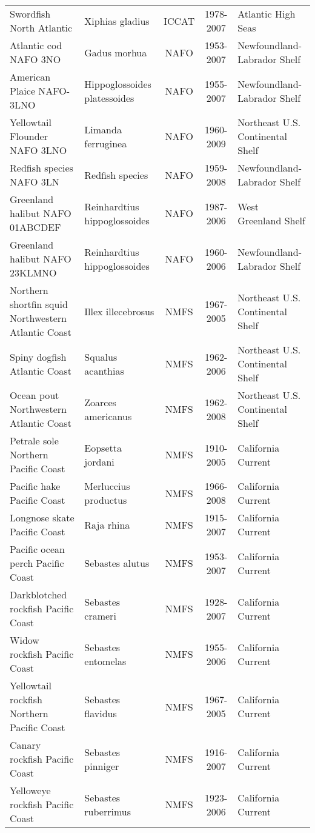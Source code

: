 \begin{longtable}{p{4cm}p{3.5cm}ccp{5.5cm}}
  Swordfish North Atlantic & Xiphias gladius & ICCAT & 1978-2007 & Atlantic High Seas \\ 
  Atlantic cod NAFO 3NO & Gadus morhua & NAFO & 1953-2007 & Newfoundland-Labrador Shelf \\ 
  American Plaice NAFO-3LNO & Hippoglossoides platessoides & NAFO & 1955-2007 & Newfoundland-Labrador Shelf \\ 
  Yellowtail Flounder NAFO 3LNO & Limanda ferruginea & NAFO & 1960-2009 & Northeast U.S. Continental Shelf \\ 
  Redfish species NAFO 3LN & Redfish species & NAFO & 1959-2008 & Newfoundland-Labrador Shelf \\ 
  Greenland halibut NAFO 01ABCDEF & Reinhardtius hippoglossoides & NAFO & 1987-2006 & West Greenland Shelf \\ 
  Greenland halibut NAFO 23KLMNO & Reinhardtius hippoglossoides & NAFO & 1960-2006 & Newfoundland-Labrador Shelf \\ 
  Northern shortfin squid Northwestern Atlantic Coast & Illex illecebrosus & NMFS & 1967-2005 & Northeast U.S. Continental Shelf \\ 
  Spiny dogfish Atlantic Coast & Squalus acanthias & NMFS & 1962-2006 & Northeast U.S. Continental Shelf \\ 
  Ocean pout Northwestern Atlantic Coast & Zoarces americanus & NMFS & 1962-2008 & Northeast U.S. Continental Shelf \\ 
  Petrale sole Northern Pacific Coast & Eopsetta jordani & NMFS & 1910-2005 & California Current \\ 
  Pacific hake Pacific Coast & Merluccius productus & NMFS & 1966-2008 & California Current \\ 
  Longnose skate Pacific Coast & Raja rhina & NMFS & 1915-2007 & California Current \\ 
  Pacific ocean perch Pacific Coast & Sebastes alutus & NMFS & 1953-2007 & California Current \\ 
  Darkblotched rockfish Pacific Coast & Sebastes crameri & NMFS & 1928-2007 & California Current \\ 
  Widow rockfish Pacific Coast & Sebastes entomelas & NMFS & 1955-2006 & California Current \\ 
  Yellowtail rockfish Northern Pacific Coast & Sebastes flavidus & NMFS & 1967-2005 & California Current \\ 
  Canary rockfish Pacific Coast & Sebastes pinniger & NMFS & 1916-2007 & California Current \\ 
  Yelloweye rockfish Pacific Coast & Sebastes ruberrimus & NMFS & 1923-2006 & California Current \\ 

\end{longtable}
